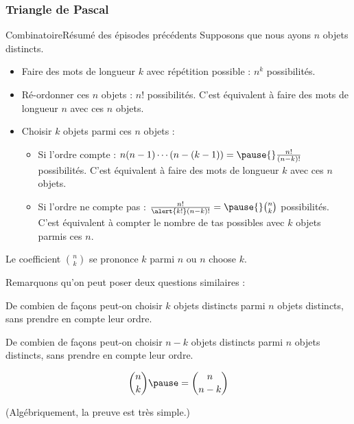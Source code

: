 \documentclass[french,xcolor=svgnames]{beamer}
\begin{document}
\begin{frame}
  \frametitle{Triangle de Pascal}\pause
  \pause
\end{frame}
\begin{frame}{Combinatoire}{Résumé des épisodes précédents}
  Supposons que nous ayons $n$ objets distincts.
  \begin{itemize}\pause
  \item Faire des mots de longueur $k$ avec répétition possible\pause{} : $n^{k}$ possibilités.\pause{}
  \item Ré-ordonner ces $n$ objets :\pause{} $n!$ possibilités.\pause{} C'est équivalent à faire des mots de longueur $n$ avec ces $n$ objets.\pause{}
  \item Choisir $k$ objets parmi ces $n$ objets :\pause{}
    \begin{itemize}
    \item Si l'ordre compte : $n (n-1) \cdots (n-(k-1)) =\pause{} \frac{n!}{(n-k)!}$ possibilités.\pause{} C'est équivalent à faire des mots de longueur $k$ avec ces $n$ objets.\pause{}
    \item Si l'ordre ne compte pas : $\frac{n!}{\alert{k!} (n-k)!} =\pause{} \binom{n}{k}$ possibilités.\pause{} C'est équivalent à compter le nombre de \og tas\fg{} possibles avec $k$ objets parmis ces $n$.\pause{}
    \end{itemize}
   \end{itemize}
   \pause
   Le coefficient $\binom n k$ se prononce \og $k$ parmi $n$\fg{} ou \og $n$ choose $k$\fg{}.
\end{frame}

\begin{frame}
  Remarquons qu'on peut poser deux questions similaires :\pause
  \begin{question}
    De combien de façons peut-on choisir \(k\) objets distincts parmi \(n\) objets distincts, sans prendre en compte leur ordre.
  \end{question}\pause
  \begin{question}
    De combien de façons peut-on choisir \(n-k\) objets distincts parmi \(n\) objets distincts, sans prendre en compte leur ordre.
  \end{question}
  \begin{answer}\pause
    \begin{equation*}
      \binom{n}{k} \pause= \binom{n}{n-k}
    \end{equation*}
  \end{answer}\pause
  (Algébriquement, la preuve est très simple.)
\end{frame}
\end{document}
